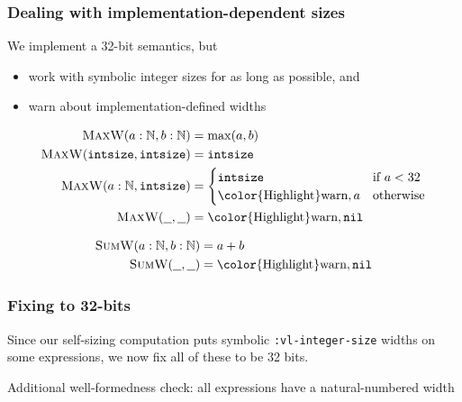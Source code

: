 \documentclass[mathserif]{beamer}
\newcommand{\Highlight}[1]{{\color{Highlight}#1}}
\begin{document}
\begin{frame}
\frametitle{Dealing with implementation-dependent sizes}

\newcommand{\mw}{\ensuremath{\textsc{MaxW}}}
\newcommand{\sw}{\ensuremath{\textsc{SumW}}}
\newcommand{\ints}{\ensuremath{\texttt{intsize}}}

We implement a 32-bit semantics, but
\begin{itemize}
\item work with symbolic integer sizes for as long as possible, and
\item warn about implementation-defined widths
\end{itemize}

\begin{align*}
\mw(a : \mathbb{N}, b : \mathbb{N}) &= \max(a,b) \\
\mw(\ints, \ints) &= \ints \\
\mw(a : \mathbb{N}, \ints) &= \begin{cases}
  \ints & \textrm{if $a < 32$} \\
  \textrm{\Highlight{warn}}, a & \textrm{otherwise}
\end{cases} \\
\mw(\underline{~~}, \underline{~~}) &= \textrm{\Highlight{warn}}, \texttt{nil}
\end{align*}

\begin{align*}
\sw(a : \mathbb{N}, b : \mathbb{N}) &= a + b \\
\sw(\underline{~~}, \underline{~~}) &= \textrm{\Highlight{warn}}, \texttt{nil}
\end{align*}

\end{frame}

\begin{frame}
\frametitle{Fixing to 32-bits}

Since our self-sizing computation puts symbolic {\tt :vl-integer-size} 
widths on some expressions, we now fix all of these to be 32 bits.

\bigskip

Additional well-formedness check: all expressions have a natural-numbered width
\end{frame}
\end{document}
